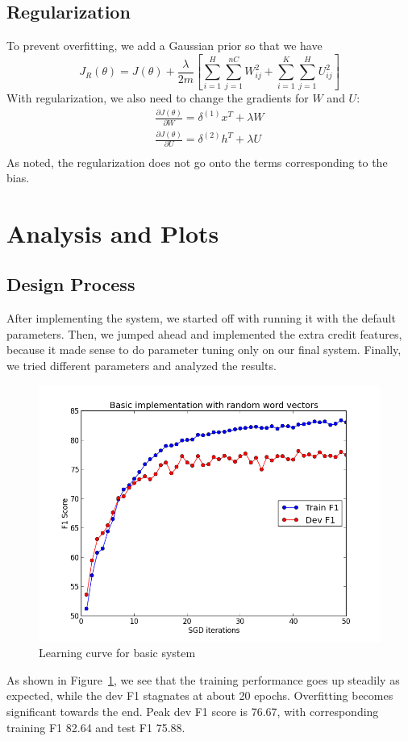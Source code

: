 \documentclass[12pt, twocolumn]{article}
\begin{document}
\subsection{Regularization}
To prevent overfitting, we add a Gaussian prior so that we have
\begin{equation*}
J_R(\theta) = J(\theta) + \frac{\lambda}{2m}[\sum_{i=1}^{H}\sum_{j=1}^{nC}W_{ij}^2 + \sum_{i=1}^{K}\sum_{j=1}^{H}U_{ij}^2]
\end{equation*}
With regularization, we also need to change the gradients for $W$ and $U$:
\begin{gather*}
\frac{\partial J(\theta)}{\partial W} = \delta^{(1)}x^T + \lambda W\\
\frac{\partial J(\theta)}{\partial U} = \delta^{(2)}h^T + \lambda U\\
\end{gather*}
As noted, the regularization does not go onto the terms corresponding to the bias.
\section{Analysis and Plots}
\subsection{Design Process}
After implementing the system, we started off with running it with the default parameters. Then, we jumped ahead and implemented the extra credit features, because it made sense to do parameter tuning only on our final system. Finally, we tried different parameters and analyzed the results.
\newpage
\begin{figure}[H]
\centering
\includegraphics[width = \linewidth]{plots/baseline}
\caption{Learning curve for basic system}
\label{fig:basic}
\end{figure}
As shown in Figure~\ref{fig:basic}, we see that the training performance goes up steadily as expected, while the dev F1 stagnates at about 20 epochs. Overfitting becomes significant towards the end. Peak dev F1 score is 76.67, with corresponding training F1 82.64 and test F1 75.88.
\end{document}
